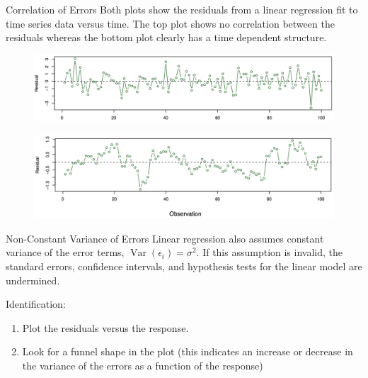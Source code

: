 \documentclass[
  ignorenonframetext,
  aspectratio=169,
]{beamer}
\begin{document}
\begin{frame}{Correlation of Errors}
\protect\hypertarget{correlation-of-errors-1}{}
Both plots show the residuals from a linear regression fit to time
series data versus time. The top plot shows no correlation between the
residuals whereas the bottom plot clearly has a time dependent
structure.

\begin{figure}

{\centering \includegraphics[width=4.66667in,height=\textheight]{images/uncorrelated_error.png}

}

\end{figure}

\begin{figure}

{\centering \includegraphics[width=4.66667in,height=\textheight]{images/correlated_error.png}

}

\end{figure}
\end{frame}

\begin{frame}{Non-Constant Variance of Errors}
\protect\hypertarget{non-constant-variance-of-errors}{}
Linear regression also assumes constant variance of the error terms,
\(\operatorname{Var}(\epsilon_i) = \sigma^2\). If this assumption is
invalid, the standard errors, confidence intervals, and hypothesis tests
for the linear model are undermined.

Identification:

\begin{enumerate}
\item
  Plot the residuals versus the response.
\item
  Look for a funnel shape in the plot (this indicates an increase or
  decrease in the variance of the errors as a function of the response)
\end{enumerate}
\end{frame}
\end{document}
